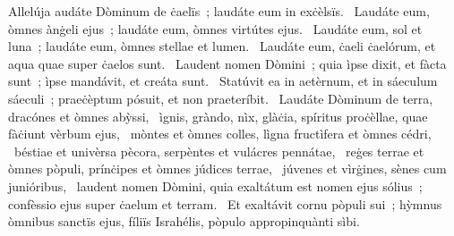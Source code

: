 { Allelúja}
{%
audáte Dòminum de ċaelïs~; laudáte eum in exċèlsïs. 
~Laudáte eum, òmnes ànġeli ejus~; laudáte eum, òmnes virtútes ejus. 
~Laudáte eum, sol et luna~; laudáte eum, òmnes stellae et lumen. 
~Laudáte eum, ċaeli ċaelórum, et aqua quae super ċaelos sunt. 
~Laudent nomen Dòmini~; quia ìpse dixit, et fàcta sunt~; ìpse mandávit, et creáta sunt. 
~Statúvit ea in aetèrnum, et in sáeculum sáeculi~; praeċèptum pósuit, et non praeteríbit. 
~Laudáte Dòminum de terra, dracónes et òmnes abỳssi, 
~ìgnis, gràndo, nìx, glàċia, spíritus proċèllae, quae fàċiunt vèrbum ejus, 
~mòntes et òmnes colles, lìgna fructìfera et òmnes cédri, 
~béstiae et univèrsa pècora, serpèntes et vulácres pennátae, 
~reġes terrae et òmnes pòpuli, prínċipes et òmnes júdices terrae, 
~júvenes et vìrġines, sènes cum junióribus, 
~laudent nomen Dòmini, quia exaltátum est nomen ejus sólius~; confèssio ejus super ċaelum et terram. 
~Et exaltávit cornu pòpuli sui~; hỳmnus òmnibus sanctïs ejus, fíliïs Israhélis, pòpulo appropinquànti sìbi. 
}
